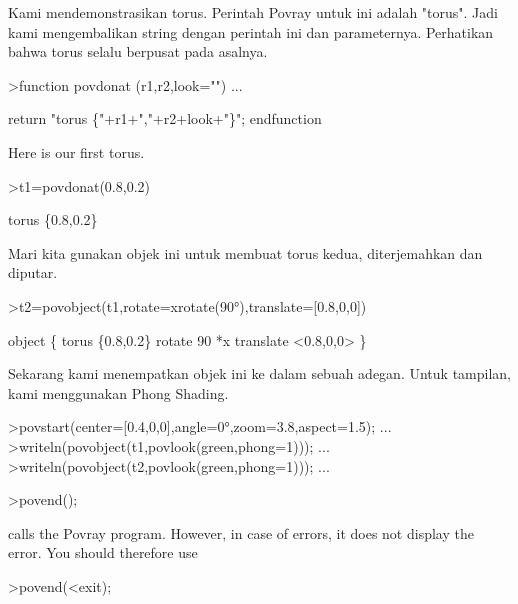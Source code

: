 \documentclass[a4paper,10pt]{article}
\begin{document}
\begin{eulernotebook}
\begin{eulercomment}
\begin{eulercomment}
\begin{eulercomment}
Kami mendemonstrasikan torus. Perintah Povray untuk ini adalah
"torus". Jadi kami mengembalikan string dengan perintah ini dan
parameternya. Perhatikan bahwa torus selalu berpusat pada asalnya.
\end{eulercomment}
\begin{eulerprompt}
>function povdonat (r1,r2,look="") ...
\end{eulerprompt}
\begin{eulerudf}
    return "torus \{"+r1+","+r2+look+"\}";
  endfunction
\end{eulerudf}
\begin{eulercomment}
Here is our first torus.
\end{eulercomment}
\begin{eulerprompt}
>t1=povdonat(0.8,0.2)
\end{eulerprompt}
\begin{euleroutput}
  torus \{0.8,0.2\}
\end{euleroutput}
\begin{eulercomment}
Mari kita gunakan objek ini untuk membuat torus kedua, diterjemahkan
dan diputar.
\end{eulercomment}
\begin{eulerprompt}
>t2=povobject(t1,rotate=xrotate(90°),translate=[0.8,0,0])
\end{eulerprompt}
\begin{euleroutput}
  object \{ torus \{0.8,0.2\}
   rotate 90 *x 
   translate <0.8,0,0>
   \}
\end{euleroutput}
\begin{eulercomment}
Sekarang kami menempatkan objek ini ke dalam sebuah adegan. Untuk
tampilan, kami menggunakan Phong Shading.
\end{eulercomment}
\begin{eulerprompt}
>povstart(center=[0.4,0,0],angle=0°,zoom=3.8,aspect=1.5); ...
>writeln(povobject(t1,povlook(green,phong=1))); ...
>writeln(povobject(t2,povlook(green,phong=1))); ...
\end{eulerprompt}
\begin{eulerttcomment}
 >povend();
\end{eulerttcomment}
\begin{eulercomment}
calls the Povray program. However, in case of errors, it does not
display the error. You should therefore use

\end{eulercomment}
\begin{eulerttcomment}
 >povend(<exit);
\end{eulerttcomment}
\begin{eulercomment}


\end{eulercomment}
\end{eulercomment}
\end{eulercomment}
\end{eulernotebook}
\end{document}
